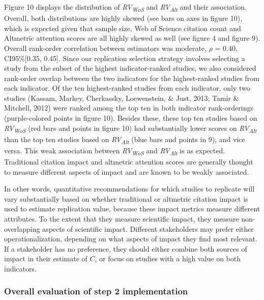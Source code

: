 \documentclass[
  english,
  man,floatsintext]{apa6}
\begin{document}
Figure 10 displays the distribution of \emph{RV\textsubscript{WoS}} and \emph{RV\textsubscript{Alt}} and their association. Overall, both distributions are highly skewed (see bars on axes in figure 10), which is expected given that sample size, Web of Science citation count and Altmetric attention scores are all highly skewed as well (see figure 4 and figure 9). Overall rank-order correlation between estimators was moderate, \(\rho\) = 0.40, CI95\%{[}0.35, 0.45{]}. Since our replication selection strategy involves selecting a study from the subset of the highest indicator-ranked studies, we also considered rank-order overlap between the two indicators for the highest-ranked studies from each indicator. Of the ten highest-ranked studies from each indicator, only two studies (Kassam, Markey, Cherkassky, Loewenstein, \& Just, 2013; Tamir \& Mitchell, 2012) were ranked among the top ten in both indicator rank-orderings (purple-colored points in figure 10). Besides these, these top ten studies based on \emph{RV\textsubscript{WoS}} (red bars and points in figure 10) had substantially lower scores on \emph{RV\textsubscript{Alt}} than the top ten studies based on \emph{RV\textsubscript{Alt}} (blue bars and points in 9), and vice versa. This weak association between \emph{RV\textsubscript{WoS}} and \emph{RV\textsubscript{Alt}} is as expected. Traditional citation impact and altmetric attention scores are generally thought to measure different aspects of impact and are known to be weakly associated.

In other words, quantitative recommendations for which studies to replicate will vary substantially based on whether traditional or altmetric citation impact is used to estimate replication value, because these impact metrics measure different attributes. To the extent that they measure scientific impact, they measure non-overlapping aspects of scientific impact. Different stakeholders may prefer either operationalization, depending on what aspects of impact they find most relevant. If a stakeholder has no preference, they should either combine both sources of impact in their estimate of \(C\), or focus on studies with a high value on both indicators.

\hypertarget{overall-evaluation-of-step-2-implementation}{%
\subsubsection{Overall evaluation of step 2 implementation}\label{overall-evaluation-of-step-2-implementation}}
\end{document}
